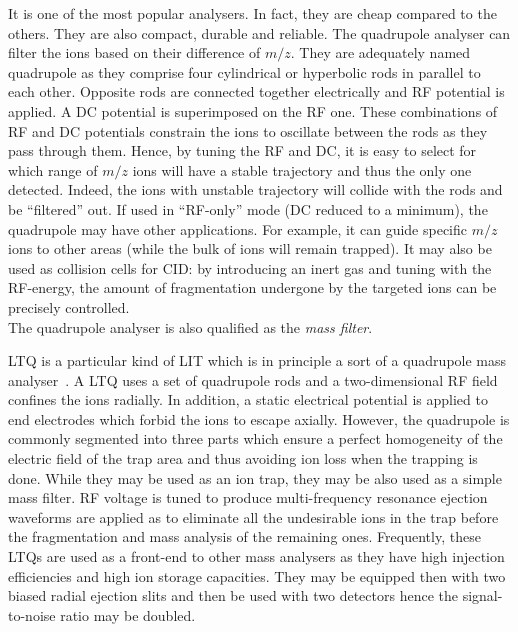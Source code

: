 It is one of the most popular analysers. In fact, they are cheap compared to the
others. They are also compact, durable and reliable. The quadrupole analyser can
filter the ions based on their difference of $m/z$. They are adequately
named quadrupole as they comprise four cylindrical or hyperbolic rods in
parallel to each other. Opposite rods are connected together electrically and
\gls{RF} potential is applied. A \gls{DC} potential is superimposed on the
\gls{RF} one. These combinations of \gls{RF} and \gls{DC} potentials constrain the
ions to oscillate between the rods as they pass through them. Hence, by tuning
the \gls{RF} and \gls{DC}, it is easy to select for which range of $m/z$ ions
will have a stable trajectory and thus the only one detected. Indeed, the
ions with unstable trajectory will collide with the rods and be \enquote{filtered}
out. If used in \enquote{\gls{RF}-only} mode (\gls{DC} reduced to a minimum),
the quadrupole may have other applications. For example, it can guide specific
$m/z$ ions to other areas (while the bulk of ions will remain trapped).
It may also be used as collision cells for \gls{CID}: by introducing an inert
gas and tuning with the \gls{RF}-energy, the amount of fragmentation undergone
by the targeted ions can be precisely controlled. \\
The quadrupole analyser is also qualified as the \emph{mass filter}.

\gls{LTQ} is a particular kind of \acrfull{LIT} which is in principle a sort of
a quadrupole mass analyser~. A \gls{LTQ} uses a set of
quadrupole rods and a two-dimensional \gls{RF} field confines the ions radially.
In addition, a static electrical potential is applied to end electrodes which
forbid the ions to escape axially. However, the quadrupole is commonly segmented
into three parts which ensure a perfect homogeneity of the electric field of the
trap area and thus avoiding ion loss when the trapping is done.
While they may be used as an ion trap, they
may be also used as a simple mass filter. \gls{RF} voltage is tuned to produce
multi-frequency resonance ejection waveforms are applied as to
eliminate all the undesirable ions in the trap before the fragmentation and mass
analysis of the remaining ones. Frequently, these \glspl{LTQ} are used as a
front-end to other mass analysers as they have high injection efficiencies and
high ion storage capacities. They may be equipped then with two biased radial
ejection slits and then be used with two detectors hence the signal-to-noise
ratio may be doubled.

